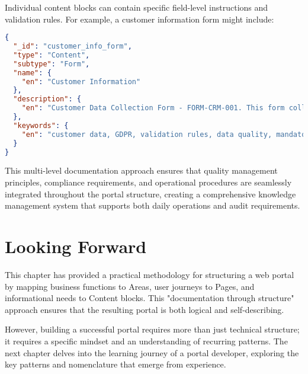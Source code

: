 Individual content blocks can contain specific field-level instructions and validation rules. For example, a customer information form might include:

\begin{lstlisting}[language=JSON,caption={Content with Field-Level Documentation},label={lst:form-content-docs}]
{
  "_id": "customer_info_form",
  "type": "Content",
  "subtype": "Form",
  "name": {
    "en": "Customer Information"
  },
  "description": {
    "en": "Customer Data Collection Form - FORM-CRM-001. This form collects essential customer information required for quote generation. All fields marked with (*) are mandatory as per our Customer Data Policy CDP-001. Data Validation Rules: Company Name (min 2, max 100 chars), Email (valid business format). Data Protection Notice: Customer data is processed according to GDPR Article 6(1)(b). Data retention period: 7 years."
  },
  "keywords": {
    "en": "customer data, GDPR, validation rules, data quality, mandatory fields"
  }
}
\end{lstlisting}

This multi-level documentation approach ensures that quality management principles, compliance requirements, and operational procedures are seamlessly integrated throughout the portal structure, creating a comprehensive knowledge management system that supports both daily operations and audit requirements.

\section{Looking Forward}
\label{sec:portal-structure-forward}

This chapter has provided a practical methodology for structuring a web portal by mapping business functions to Areas, user journeys to Pages, and informational needs to Content blocks. This "documentation through structure" approach ensures that the resulting portal is both logical and self-describing.

However, building a successful portal requires more than just technical structure; it requires a specific mindset and an understanding of recurring patterns. The next chapter delves into the learning journey of a portal developer, exploring the key patterns and nomenclature that emerge from experience.
